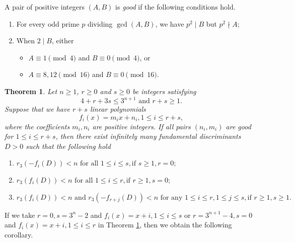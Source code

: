 \documentclass{amsart}
\newtheorem{theorem}{Theorem}[section]
\begin{document}
A pair of positive integers $(A, B)$ is \emph{good} if the following conditions hold.
\begin{enumerate}
\item[(i)] For every odd prime $p$ dividing $\operatorname{gcd}(A, B)$, we have $p^{2} \mid B$ but $p^{2} \nmid A$;
\item[(ii)] When $2 \mid B$, either
\begin{itemize}
\item $A \equiv 1\pmod 4$ and $B \equiv 0\pmod 4$, or
\item $A \equiv 8,12\pmod {16}$ and $B \equiv 0\pmod {16}$.
\end{itemize}
\end{enumerate}


\begin{theorem}\label{th1}
Let $n\ge1$,   $r\ge0$ and $s\ge0$ be integers satisfying \[4+r+3 s\le3^{n+1}\text{ and }r+s\ge1.\] Suppose that we have $r+s$ linear polynomials
$$f_{i}(x)=m_{i} x+n_{i},1 \le i \le r+s,$$
where the coefficients $m_i, n_i $ are positive integers. If all pairs $\left( n_{i} , m_{i}\right)$ are good for $ 1\le i\le r+s$, then there exist infinitely many fundamental discriminants $D>0$  such that the following hold 
 \begin{enumerate}
 \item $r_3(-f_i(D))<n   \text{ for all }  1\le i\le s,   \mbox{if }  s\ge1, r=0 ;$
 \item $r_3(f_i(D))<n \text{ for all } 1\le i\le r,   \mbox{if }  r\ge1, s=0;$ 
 \item $r_3(f_i(D))<n \text{ and } r_3( -f_{r+j}(D)) <n   \text{ for any }  1\le i\le r, 1\le j\le s, \mbox{if } r\ge1, s\ge1.$
 \end{enumerate}
 
 
\end{theorem}

If we take $r=0, s=3^{n}-2$ and $f_{i}(x)=x+i, 1 \le i \le s$ or $r=3^{n+1}-4, s=0$ and $f_{i}(x)=x+i, 1 \le i \le r$ in Theorem \ref{th1}, then we obtain the following corollary.
\end{document}
